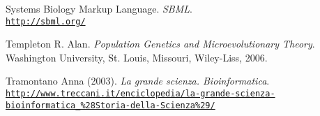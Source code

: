 \documentclass[twoside,openright,titlepage,fleqn,
,	headinclude,12pt,a4paper,BCOR5mm,footinclude,table]{scrbook}
\newcommand{\?}{'\-\nobreak\hspace{0pt}}
\begin{document}
\begin{thebibliography}{60}
Systems Biology Markup Language.\newline
\textit{SBML}.
\\\texttt{\url{http://sbml.org/}}

Templeton R. Alan.\newline
\textit{Population Genetics and Microevolutionary Theory}.\newline
Washington University, St. Louis, Missouri, Wiley-Liss, 2006.

Tramontano Anna (2003).\newline
\textit{La grande scienza. Bioinformatica}.
\\\texttt{\url{http://www.treccani.it/enciclopedia/la-grande-scienza-bioinformatica_\%28Storia-della-Scienza\%29/}}

\end{thebibliography}


\end{document}
